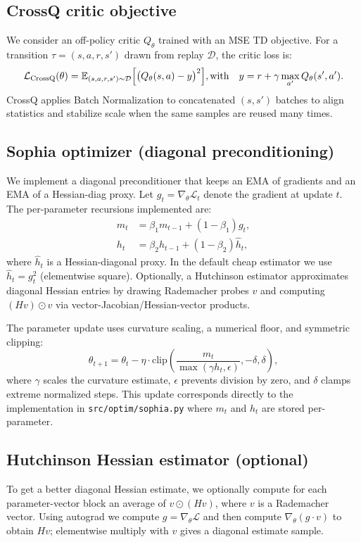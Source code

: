 \documentclass{article}
\begin{document}
\subsection{CrossQ critic objective}
We consider an off-policy critic $Q_\theta$ trained with an MSE TD objective. For a transition $\tau=(s,a,r,s')$ drawn from replay $\mathcal{D}$, the critic loss is:
\[
\mathcal{L}_{\text{CrossQ}}(\theta) = \mathbb{E}_{(s,a,r,s')\sim\mathcal{D}}\Big[\big(Q_\theta(s,a) - y\big)^2\Big],\\
\text{with}\quad y = r + \gamma \max_{a'} Q_\theta(s',a').
\]
CrossQ applies Batch Normalization to concatenated $(s,s')$ batches to align statistics and stabilize scale when the same samples are reused many times.

\subsection{Sophia optimizer (diagonal preconditioning)}
We implement a diagonal preconditioner that keeps an EMA of gradients and an EMA of a Hessian-diag proxy. Let $g_t = \nabla_\theta \mathcal{L}_t$ denote the gradient at update $t$. The per-parameter recursions implemented are:
\begin{align}
m_t &= \beta_1 m_{t-1} + (1-\beta_1) g_t, \\[4pt]
h_t &= \beta_2 h_{t-1} + (1-\beta_2) \hat{h}_t, \label{eq:hema}
\end{align}
where $\hat{h}_t$ is a Hessian-diagonal proxy. In the default cheap estimator we use $\hat{h}_t = g_t^2$ (elementwise square). Optionally, a Hutchinson estimator approximates diagonal Hessian entries by drawing Rademacher probes $v$ and computing $(H v) \odot v$ via vector-Jacobian/Hessian-vector products.

The parameter update uses curvature scaling, a numerical floor, and symmetric clipping:
\[
\theta_{t+1} = \theta_t - \eta \cdot \mathrm{clip}\!\left(\frac{m_t}{\max(\gamma h_t, \epsilon)}, -\delta, \delta\right),
\label{eq:sophia}
\]
where $\gamma$ scales the curvature estimate, $\epsilon$ prevents division by zero, and $\delta$ clamps extreme normalized steps. This update corresponds directly to the implementation in \texttt{src/optim/sophia.py} where $m_t$ and $h_t$ are stored per-parameter.

\subsection{Hutchinson Hessian estimator (optional)}
To get a better diagonal Hessian estimate, we optionally compute for each parameter-vector block an average of $v \odot (H v)$, where $v$ is a Rademacher vector. Using autograd we compute $g = \nabla_\theta \mathcal{L}$ and then compute $\nabla_\theta (g \cdot v)$ to obtain $H v$; elementwise multiply with $v$ gives a diagonal estimate sample.
\end{document}
